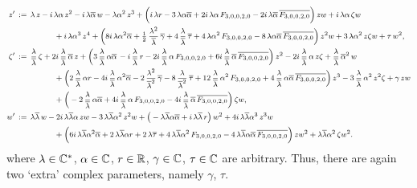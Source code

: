 \documentclass[12pt,twoside,leqno,openany]{amsart}
\begin{document}
\[
\footnotesize
\aligned
z'
&
\,:=\,
\lambda\,z
-
i\,\lambda\alpha\,z^2
-
i\,\lambda\overline{\alpha}\,w
-
\lambda\alpha^2\,
z^3
+
\Big(
i\,\lambda r
-
3\,\lambda\alpha\overline{\alpha}
+
2i\,\lambda\alpha\,
F_{3,0,0,2,0}
-
2i\,\lambda\overline{\alpha}\,\overline{F_{3,0,0,2,0}}
\Big)\,
zw
+
i\,\lambda\alpha\,
\zeta w
\\
&
\ \ \ \ \ \ \ \ \ \ \ \ \ \ \
+ 
i\,\lambda\alpha^3\,
z^4
+
\Big(
8i\,\lambda\alpha^2\overline{\alpha}
+
\tfrac{1}{2}\,\frac{\lambda^2}{\overline{\lambda}}\,\overline{\gamma}
+
4\,\frac{\lambda}{\overline{\lambda}}\,\overline{\tau}
+
4\,\lambda\alpha^2\,F_{3,0,0,2,0}
-
8\,\lambda\alpha\overline{\alpha}\,\overline{F_{3,0,0,2,0}}
\Big)\,
z^2w
+
3\,\lambda\alpha^2\,
z\zeta w
+
\tau\,w^2,
\\
\zeta'
&
\,:=\,
\frac{\lambda}{\overline{\lambda}}\,\zeta
+
2i\,\frac{\lambda}{\overline{\lambda}}\,\overline{\alpha}\,
z
+
\Big(
3\,\frac{\lambda}{\overline{\lambda}}\,\alpha\overline{\alpha}\,
-
i\,\frac{\lambda}{\overline{\lambda}}\,r
-
2i\,\frac{\lambda}{\overline{\lambda}}\,\alpha\,
F_{3,0,0,2,0}
+
6i\,\frac{\lambda}{\overline{\lambda}}\,\overline{\alpha}\,
\overline{F_{3,0,0,2,0}}
\Big)\,
z^2
-
2i\,\frac{\lambda}{\overline{\lambda}}\,\alpha\,
z\zeta
+
\frac{\lambda}{\overline{\lambda}}\,\overline{\alpha}^2\,
w
\\
&
\ \ \ \ \ \ \ \ \ \ \ \ \ \ \
+
\Big(
2\,\frac{\lambda}{\overline{\lambda}}\,\alpha r
-
4i\,\frac{\lambda}{\overline{\lambda}}\,\alpha^2\overline{\alpha}
-
2\,\frac{\lambda^2}{\overline{\lambda}^2}\,\overline{\gamma}
-
8\,\frac{\lambda}{\overline{\lambda}^2}\,\overline{\tau}
+
12\,\frac{\lambda}{\overline{\lambda}}\,\alpha^2\,
F_{3,0,0,2,0}
+
4\,\frac{\lambda}{\overline{\lambda}}\,\alpha\overline{\alpha}\,
\overline{F_{3,0,0,2,0}}
\Big)\,z^3
-
3\,\frac{\lambda}{\overline{\lambda}}\,\alpha^2\,
z^2\zeta
+
\gamma\,zw
\\
&
\ \ \ \ \ \ \ \ \ \ \ \ \ \ \
+
\Big(
-2\,\frac{\lambda}{\overline{\lambda}}\,
\alpha\overline{\alpha}
+
4i\,\frac{\lambda}{\overline{\lambda}}\,\alpha\,
F_{3,0,0,2,0}
-
4i\,\frac{\lambda}{\overline{\lambda}}\,\overline{\alpha}\,
\overline{F_{3,0,0,2,0}}
\Big)\,
\zeta w,
\\
w'
&
\,:=\,
\lambda\overline{\lambda}\,w
-
2i\,\lambda\overline{\lambda}\alpha\,
zw
-
3\,\lambda\overline{\lambda}\alpha^2\,
z^2w
+
\big(
-\lambda\overline{\lambda}\alpha\overline{\alpha}
+
i\,\lambda\overline{\lambda}\,r
\big)\,w^2
+
4i\,\lambda\overline{\lambda}\alpha^3\,
z^3w
\\
&
\ \ \ \ \ \ \ \ \ \ \ \ \ \ \
+
\Big(
6i\,\lambda\overline{\lambda}\alpha^2\overline{\alpha}
+
2\,\lambda\overline{\lambda}\alpha r
+
2\,\lambda\overline{\tau}
+
4\,\lambda\overline{\lambda}\alpha^2\,
F_{3,0,0,2,0}
-
4\,\lambda\overline{\lambda}\alpha\overline{\alpha}\,
\overline{F_{3,0,0,2,0}}
\Big)\,
zw^2
+
\lambda\overline{\lambda}\alpha^2\,\zeta w^2.
\endaligned
\]
where $\lambda \in \mathbb{C}^\ast$, $\alpha \in \mathbb{C}$, $r \in \mathbb{R}$,
$\gamma \in \mathbb{C}$, $\tau \in \mathbb{C}$ are arbitrary.
Thus, there are again two `extra' complex parameters,
namely $\gamma$, $\tau$.
\end{document}
